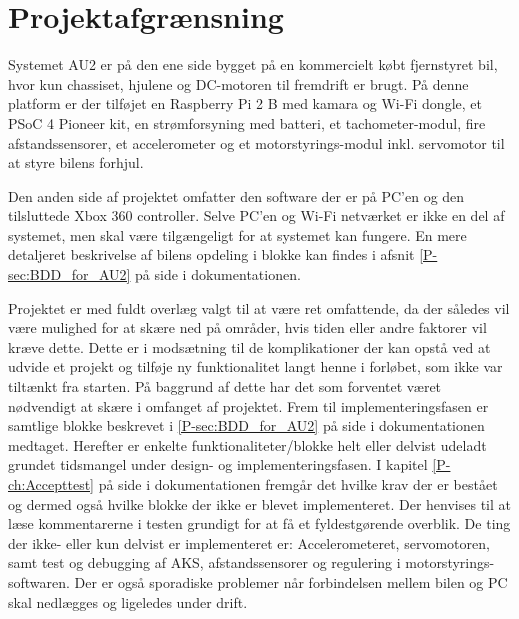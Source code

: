 \chapter{Projektafgrænsning} \label{ch:Projektafgraensning}

Systemet AU2 er på den ene side bygget på en kommercielt købt fjernstyret bil, hvor kun chassiset, hjulene og DC-motoren til fremdrift er brugt. 
På denne platform er der tilføjet en Raspberry Pi 2 B med kamara og Wi-Fi dongle, et PSoC 4 Pioneer kit, en strømforsyning med batteri, et tachometer-modul, fire afstandssensorer, et accelerometer og et motorstyrings-modul inkl. servomotor til at styre bilens forhjul.

Den anden side af projektet omfatter den software der er på PC'en og den tilsluttede Xbox 360 controller. 
Selve PC'en og Wi-Fi netværket er ikke en del af systemet, men skal være tilgængeligt for at systemet kan fungere.
En mere detaljeret beskrivelse af bilens opdeling i blokke kan findes i afsnit \ref{P-sec:BDD_for_AU2}  på side \pageref{P-sec:BDD_for_AU2} i dokumentationen. 

Projektet er med fuldt overlæg valgt til at være ret omfattende, da der således vil være mulighed for at skære ned på områder, hvis tiden eller andre faktorer vil kræve dette. 
Dette er i modsætning til de komplikationer der kan opstå ved at udvide et projekt og tilføje ny funktionalitet langt henne i forløbet, som ikke var tiltænkt fra starten. 
På baggrund af dette har det som forventet været nødvendigt at skære i omfanget af projektet. Frem til implementeringsfasen er samtlige blokke beskrevet i \ref{P-sec:BDD_for_AU2}  på side \pageref{P-sec:BDD_for_AU2} i dokumentationen medtaget.
Herefter er enkelte funktionaliteter/blokke helt eller delvist udeladt grundet tidsmangel under design- og implementeringsfasen.
I kapitel \ref{P-ch:Accepttest}  på side \pageref{P-ch:Accepttest} i dokumentationen fremgår det hvilke krav der er bestået og dermed også hvilke blokke der ikke er blevet implementeret. 
Der henvises til at læse kommentarerne i testen grundigt for at få et fyldestgørende overblik. 
De ting der ikke- eller kun delvist er implementeret er: Accelerometeret, servomotoren, samt test og debugging af AKS, afstandssensorer og regulering i motorstyrings-softwaren. 
Der er også sporadiske problemer når forbindelsen mellem bilen og PC skal nedlægges og ligeledes under drift.
